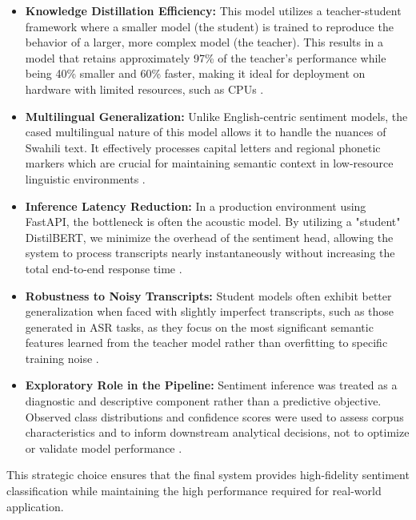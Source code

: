 \begin{itemize}
    \item \textbf{Knowledge Distillation Efficiency:} This model utilizes a teacher-student framework where a smaller model (the student) is trained to reproduce the behavior of a larger, more complex model (the teacher). This results in a model that retains approximately 97\% of the teacher's performance while being 40\% smaller and 60\% faster, making it ideal for deployment on hardware with limited resources, such as CPUs \citep{wolf2020huggingfacestransformersstateoftheartnatural}.
    
    \item \textbf{Multilingual Generalization:} Unlike English-centric sentiment models, the cased multilingual nature of this model allows it to handle the nuances of Swahili text. It effectively processes capital letters and regional phonetic markers which are crucial for maintaining semantic context in low-resource linguistic environments \citep{Kumar_Deep_Kalra_2024}.
    
    \item \textbf{Inference Latency Reduction:} In a production environment using FastAPI, the bottleneck is often the acoustic model. By utilizing a "student" DistilBERT, we minimize the overhead of the sentiment head, allowing the system to process transcripts nearly instantaneously without increasing the total end-to-end response time \citep{Bodor_Hnida_Daoudi_2023}.
    
    \item \textbf{Robustness to Noisy Transcripts:} Student models often exhibit better generalization when faced with slightly imperfect transcripts, such as those generated in ASR tasks, as they focus on the most significant semantic features learned from the teacher model rather than overfitting to specific training noise \citep{Wu_Jin_Shi_Liang_Zhan_2024}.

    \item \textbf{Exploratory Role in the Pipeline:} Sentiment inference was treated as a diagnostic and descriptive component rather than a predictive objective. Observed class distributions and confidence scores were used to assess corpus characteristics and to inform downstream analytical decisions, not to optimize or validate model performance \citep{Mabokela_Ngcobo_Masala_2025}.
\end{itemize}

This strategic choice ensures that the final system provides high-fidelity sentiment classification while maintaining the high performance required for real-world application.

